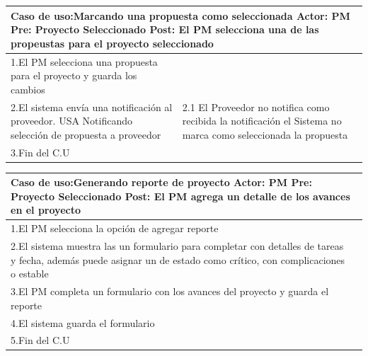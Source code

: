 \begin{longtable}{|p{}|p{}|}
    \hline
    \multicolumn{2}{|p{16cm}|}{
        \textbf{Caso de uso:}Marcando una propuesta como seleccionada\newline
        \textbf{Actor:} PM\newline
        \textbf{Pre: }Proyecto Seleccionado\newline
        \textbf{Post:} El PM selecciona una de las propeustas para el proyecto seleccionado
    }\\
    \hline
    1.El PM selecciona una propuesta para el proyecto y guarda los cambios&\\
    \hline
    2.El sistema envía una notificación al proveedor. USA Notificando selección de propuesta a proveedor& 2.1 El Proveedor no notifica como recibida la notificación \newline 2.2 el Sistema no marca como seleccionada la propuesta\\
    \hline
    3.Fin del C.U&\\
    \hline
\end{longtable}

\begin{longtable}{|p{}|p{}|}
    \hline
    \multicolumn{2}{|p{16cm}|}{
        \textbf{Caso de uso:}Generando reporte de proyecto\newline
        \textbf{Actor:} PM\newline
        \textbf{Pre: }Proyecto Seleccionado\newline
        \textbf{Post:} El PM agrega un detalle de los avances en el proyecto
    }\\
    \hline
    1.El PM selecciona la opción de agregar reporte &\\
    \hline
    2.El sistema muestra las un formulario para completar con detalles de tareas y fecha, además puede asignar un de estado como crítico, con complicaciones o estable& \\
    \hline
    3.El PM completa un formulario con los avances del proyecto y guarda el reporte&\\
    \hline
    4.El sistema guarda el formulario&\\
    \hline
    5.Fin del C.U&\\
    \hline
\end{longtable}


